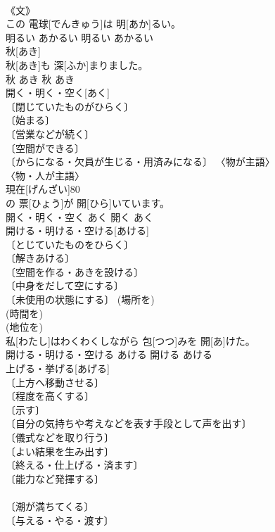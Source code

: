 \documentclass[8pt]{extreport}
\begin{document}
\begin{CJK}{UTF8}{min}
\\	《文》 
\\	この 電球[でんきゅう]は 明[あか]るい。	
\\	明るい	あかるい	明るい	あかるい	
\\	秋[あき]	
\\	秋[あき]も 深[ふか]まりました。	
\\	秋	あき	秋	あき	
\\	開く・明く・空く[あく]	
\\	〔閉じていたものがひらく〕 
\\	〔始まる〕 
\\	〔営業などが続く〕 
\\	〔空間ができる〕 
\\	〔からになる・欠員が生じる・用済みになる〕 〈物が主語〉 
\\	〈物・人が主語〉 
\\	現在[げんざい]80
\\	の 票[ひょう]が 開[ひら]いています。	
\\	開く・明く・空く	あく	開く	あく	
\\	開ける・明ける・空ける[あける]	
\\	〔とじていたものをひらく〕 
\\	〔解きあける〕 
\\	〔空間を作る・あきを設ける〕 
\\	〔中身をだして空にする〕 
\\	〔未使用の状態にする〕 (場所を) 
\\	(時間を) 
\\	(地位を) 
\\	私[わたし]はわくわくしながら 包[つつ]みを 開[あ]けた。	
\\	開ける・明ける・空ける	あける	開ける	あける	
\\	上げる・挙げる[あげる]	
\\	〔上方へ移動させる〕 
\\	〔程度を高くする〕 
\\	〔示す〕 
\\	〔自分の気持ちや考えなどを表す手段として声を出す〕 
\\	〔儀式などを取り行う〕 
\\	〔よい結果を生み出す〕 
\\	〔終える・仕上げる・済ます〕 
\\	〔能力など発揮する〕 
\\	[⇒あげて] 
\\	〔潮が満ちてくる〕 
\\	〔与える・やる・渡す〕 

\end{CJK}
\end{document}
